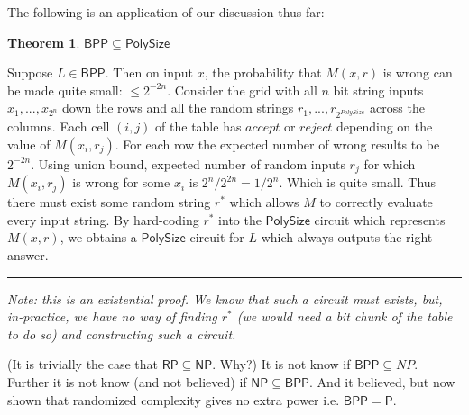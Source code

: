 \documentclass[twoside]{article}
\newcounter{lecnum}
\newtheorem{theorem}{Theorem}[lecnum]
\newenvironment{proof}{{\bf Proof:}}{\hfill\rule{2mm}{2mm}}
\def\P{\mathsf{P}}
\def\NP{\mathsf{NP}}
\def\BPP{\mathsf{BPP}}
\def\RP{\mathsf{RP}}
\def\PolySize{\mathsf{PolySize}}
\begin{document}
The following is an application of our discussion thus far:
\begin{theorem}
$\BPP \subseteq \PolySize$
\end{theorem}
\begin{proof}
Suppose $L \in \BPP$. Then on input $x$, the probability that $M(x,r)$ is wrong can be made quite small: $\leq 2^{-2n}$. Consider the grid with all $n$ bit string inputs $x_1, ..., x_{2^n}$ down the rows and all the random strings $r_1, ..., r_{2^{PolySize}}$ across the columns. Each cell $(i,j)$ of the table has $accept$ or $reject$ depending on the value of $M(x_i, r_j)$. For each row the expected number of wrong results to be $2^{-2n}$. Using union bound, expected number of random inputs $r_j$ for which $M(x_i, r_j)$ is wrong for some $x_i$ is $2^n/2^{2n} = 1/2^n$. Which is quite small. Thus there must exist some random string $r^*$ which allows $M$ to correctly evaluate every input string. By hard-coding $r^*$ into the $\PolySize$ circuit which represents $M(x,r)$, we obtains a $\PolySize$ circuit for $L$ which always outputs the right answer. 
\end{proof}

\emph{Note: this is an existential proof. We know that such a circuit must exists, but, in-practice, we have no way of finding $r^*$ (we would need a bit chunk of the table to do so) and constructing such a circuit.}  

(It is trivially the case that $\RP \subseteq \NP$. Why?)
It is not know if $\BPP \subseteq NP$. Further it is not know (and not believed) if $\NP \subseteq \BPP$. And it believed, but now shown that randomized complexity gives no extra power i.e. $\BPP = \P$.
\end{document}
